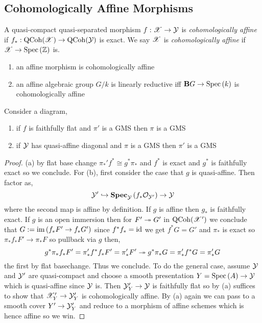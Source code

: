 \documentclass[12pt]{article}
\begin{document}
\subsection{Cohomologically Affine Morphisms}

\begin{defn}
A quasi-compact quasi-separated morphism $f : \mathscr{X} \to \mathcal{Y}$ is \textit{cohomologically affine} if $f_* : \mathrm{QCoh}(\mathscr{X}) \to \mathrm{QCoh}(\mathcal{Y})$ is exact. We say $\mathscr{X}$ is \textit{cohomologically affine} if $\mathscr{X} \to \mathrm{Spec}\left( \mathbb{Z} \right)$ is.
\end{defn}

\begin{example}
\begin{enumerate}
\item an affine morphism is cohomologically affine
\item an affine algebraic group $G / k$ is linearly reductive iff $\mathbf{B} G \to \mathrm{Spec}\left( k \right)$ is cohomologically affine
\end{enumerate}
\end{example}

\begin{lemma}
Consider a diagram,
\begin{center}
\end{center}

\begin{enumerate}
\item if $f$ is faithfully flat and $\pi'$ is a GMS then $\pi$ is a GMS
\item if $\mathcal{Y}$ has quasi-affine diagonal and $\pi$ is a GMS then $\pi'$ is a GMS
\end{enumerate}
\end{lemma}

\begin{proof}
(a) by flat base change $\pi_*' f^* \cong g^* \pi_*$ and $f^*$ is exact and $g^*$ is faithfully exact so we conclude. For (b), first consider the case that $g$ is quasi-affine. Then factor as,
\[ \mathcal{Y}' \hookrightarrow \mathbf{Spec}_{\mathcal{Y}}\left( f_* \mathcal{O}_{\mathcal{Y}'} \right) \to \mathcal{Y} \]
where the second map is affine by definition. If $g$ is affine then $g_*$ is faithfully exact. If $g$ is an open immersion then for $F' \twoheadrightarrow G'$ in $\mathrm{QCoh}(\mathscr{X}')$ we conclude that $G := \operatorname{\mathrm{im}}{(f_* F' \to f_* G')}$ since $f^* f_* = \mathrm{id}$ we get $f^* G = G'$ and $\pi_*$ is exact so $\pi_* f_* F' \to \pi_* F$ so pullback via $g$ then,
\[ g^* \pi_* f_* F' = \pi_*' f^* f_* F' = \pi'_* F' \twoheadrightarrow g^* \pi_* G = \pi'_* f^* G = \pi_*' G \]
the first by flat basechange. Thus we conclude. To do the general case, assume $\mathcal{Y}$ and $\mathcal{Y}'$ are quasi-compact and choose a smooth presentation $Y = \mathrm{Spec}\left( A \right) \to \mathcal{Y}$ which is quasi-affine since $\mathcal{Y}$ is. Then $\mathcal{Y}'_Y \to \mathcal{Y}$ is faithfully flat so by (a) suffices to show that $\mathscr{X}'_Y \to \mathcal{Y}'_Y$ is cohomologically affine. By (a) again we can pass to a smooth cover $Y' \to \mathcal{Y}'_{Y}$ and reduce to a morphism of affine schemes which is hence affine so we win. 
\end{proof}
\end{document}
